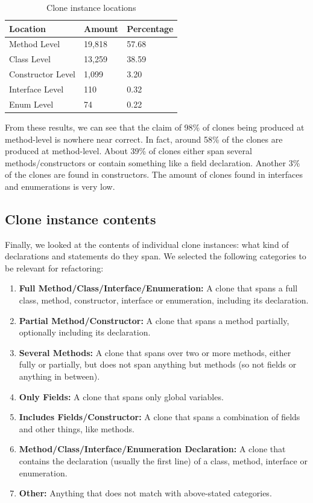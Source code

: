 \documentclass[a4paper]{article}
\begin{document}
\begin{table}[H]
  \begin{center}
  \caption{Clone instance locations} \label{table:locations}
  \bigskip
\begin{tabular}{|l|l|l|}
\hline
\textbf{Location}  & \textbf{Amount}  & \textbf{Percentage} \\ \hline
Method Level       & 19,818           & 57.68               \\ \hline
Class Level        & 13,259           & 38.59               \\ \hline
Constructor Level  & 1,099            & 3.20                \\ \hline
Interface Level    & 110              & 0.32                \\ \hline
Enum Level         & 74               & 0.22                \\ \hline
\end{tabular}
\end{center}
\end{table}

From these results, we can see that the claim of 98\% of clones being produced at method-level is nowhere near correct. In fact, around 58\% of the clones are produced at method-level. About 39\% of clones either span several methods/constructors or contain something like a field declaration. Another 3\% of the clones are found in constructors. The amount of clones found in interfaces and enumerations is very low.

\subsection{Clone instance contents}
Finally, we looked at the contents of individual clone instances: what kind of declarations and statements do they span. We selected the following categories to be relevant for refactoring:
\begin{enumerate}
  \item \textbf{Full Method/Class/Interface/Enumeration:} A clone that spans a full class, method, constructor, interface or enumeration, including its declaration.
  \item \textbf{Partial Method/Constructor:} A clone that spans a method partially, optionally including its declaration.
  \item \textbf{Several Methods:} A clone that spans over two or more methods, either fully or partially, but does not span anything but methods (so not fields or anything in between).
  \item \textbf{Only Fields:} A clone that spans only global variables.
  \item \textbf{Includes Fields/Constructor:} A clone that spans a combination of fields and other things, like methods.
  \item \textbf{Method/Class/Interface/Enumeration Declaration:} A clone that contains the declaration (usually the first line) of a class, method, interface or enumeration.
  \item \textbf{Other:} Anything that does not match with above-stated categories.
\end{enumerate}
\end{document}
